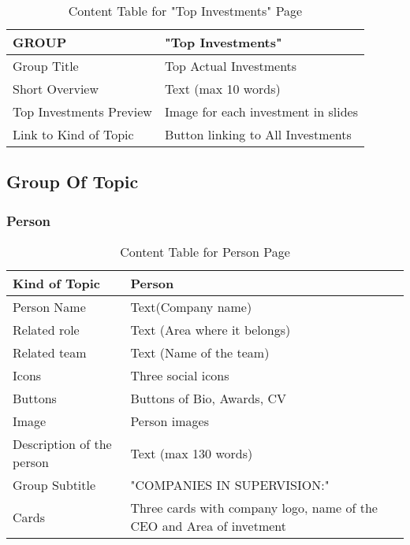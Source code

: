 \documentclass[../../DD.tex]{subfiles}
\begin{document}
\begin{table}[h]
    \begin{tabular}{ |l|p{}| }
    \hline
    GROUP & "Top Investments"\\
    \hline
    Group Title & Top Actual Investments\\
    \hline
    Short Overview & Text (max 10 words) \\
    \hline
   Top Investments Preview & Image for each investment in slides\\
    \hline
   Link to Kind of Topic  & Button linking to All Investments \\
    \hline
\end{tabular}
\caption{Content Table for "Top Investments" Page}
\end{table}
\clearpage
\subsection{Group Of Topic}

    \subsubsection{Person}

    \begin{table}[h]
    \begin{tabular}{ |l|p{}| }
    \hline
    Kind of Topic & Person\\
    \hline
    Person Name & Text(Company name) \\
    \hline
    Related role & Text (Area where it belongs) \\
    \hline
    Related team & Text (Name of the team)\\
    \hline
    Icons & Three social icons \\
    \hline
    Buttons & Buttons of Bio, Awards, CV \\
    \hline
    Image & Person images \\
    \hline
    Description of the person & Text (max 130 words) \\
    \hline
    Group Subtitle & "COMPANIES IN SUPERVISION:" \\
    \hline
    Cards & Three cards with company logo, name of the CEO and Area of invetment \\
    \hline
\end{tabular}
\caption{Content Table for Person Page}
\end{table}
\end{document}
